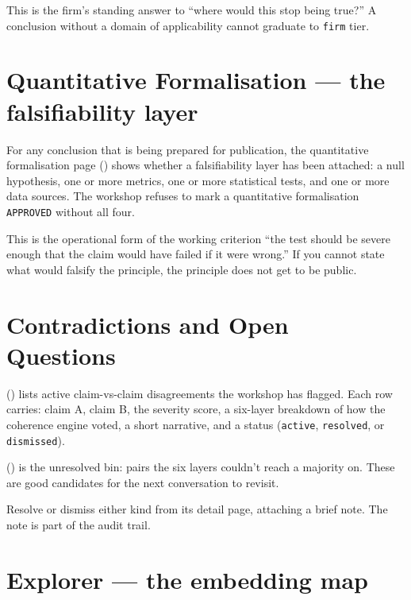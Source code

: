 \documentclass[11pt]{article}
\begin{document}
This is the firm's standing answer to ``where would this stop being
true?'' A conclusion without a domain of applicability cannot
graduate to \texttt{firm} tier.


\section{Quantitative Formalisation --- the falsifiability layer}

For any conclusion that is being prepared for publication, the
quantitative formalisation page ()
shows whether a falsifiability layer has been attached: a null
hypothesis, one or more metrics, one or more statistical tests, and
one or more data sources. The workshop refuses to mark a quantitative
formalisation \texttt{APPROVED} without all four.

This is the operational form of the working criterion ``the test
should be severe enough that the claim would have failed if it were
wrong.'' If you cannot state what would falsify the principle, the
principle does not get to be public.

\section{Contradictions and Open Questions}

 () lists active
claim-vs-claim disagreements the workshop has flagged. Each row
carries: claim A, claim B, the severity score, a six-layer breakdown
of how the coherence engine voted, a short narrative, and a status
(\texttt{active}, \texttt{resolved}, or \texttt{dismissed}).

 () is the unresolved bin:
pairs the six layers couldn't reach a majority on. These are good
candidates for the next conversation to revisit.

Resolve or dismiss either kind from its detail page, attaching a brief
note. The note is part of the audit trail.

\section{Explorer --- the embedding map}
\end{document}
